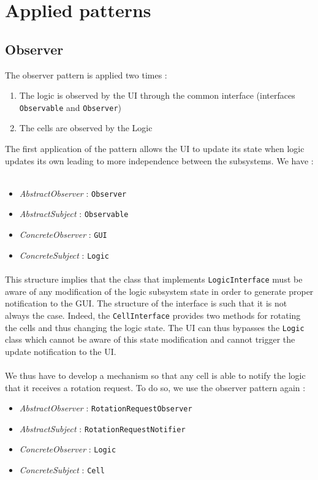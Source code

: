 \documentclass[a4paper,11pt]{article}
\begin{document}
\section{Applied patterns}
\subsection{Observer}
The observer pattern is applied two times : 
\begin{enumerate}
	\item The logic is observed by the UI through the common interface (interfaces \texttt{Observable} and \texttt{Observer})
	\item The cells are observed by the Logic
\end{enumerate}
The first application of the pattern allows the UI to update its state when logic updates its own leading to more independence between the subsystems. We have : \\ \\
\begin{itemize}
	\item \textit{AbstractObserver} : \texttt{Observer}
	\item \textit{AbstractSubject} : \texttt{Observable}
	\item \textit{ConcreteObserver} : \texttt{GUI}
	\item \textit{ConcreteSubject} : \texttt{Logic}
\end{itemize}
\paragraph{}
 This structure implies that the class that implements \texttt{LogicInterface} must be aware of any modification of the logic subsystem state in order to generate proper notification to the GUI. The structure of the interface is such that it is not always the case. Indeed, the \texttt{CellInterface} provides two methods for rotating the cells and thus changing the logic state. The UI can thus bypasses the \texttt{Logic} class which cannot be aware of this state modification and cannot trigger the update notification to the UI.
\\ \\ 
We thus have to develop a mechanism so that any cell is able to notify the logic that it receives a rotation request. To do so, we use the observer pattern again :\\
\begin{itemize}
	\item \textit{AbstractObserver} : \texttt{RotationRequestObserver}
	\item \textit{AbstractSubject} : \texttt{RotationRequestNotifier}
	\item \textit{ConcreteObserver} : \texttt{Logic}
	\item \textit{ConcreteSubject} : \texttt{Cell}
\end{itemize}
\end{document}

